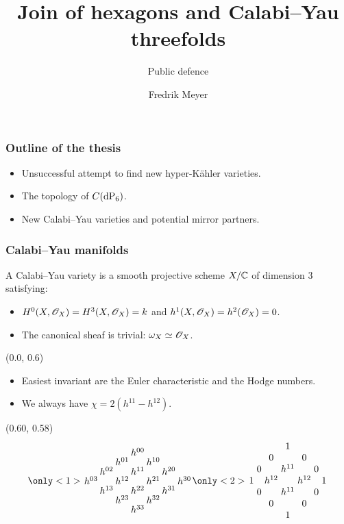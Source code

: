 \documentclass[UKenglish]{beamer}
\title{Join of hexagons and {Calabi--Yau} threefolds}
\subtitle{Public defence}
\author{Fredrik Meyer}
\begin{document}
\begin{frame}
\frametitle{Outline of the thesis}

\begin{itemize}
	\item Unsuccessful attempt to find new hyper-Kähler varieties.
	\item The topology of $C(\dP6)$.
	\item New Calabi--Yau varieties and potential mirror partners.
\end{itemize}

\end{frame}


\begin{frame}
\frametitle{Calabi--Yau manifolds}

\begin{definition}
A Calabi--Yau variety is a smooth projective scheme $X/\mathbb C$ of dimension $3$ satisfying:
\begin{itemize}
	\item $H^0(X,\mathscr{O}_X)=H^3(X,\mathscr{O}_X)=k$ and $h^1(X,\mathscr{O}_X)=h^2(\mathscr{O}_X)=0$.
	\item The canonical sheaf is trivial: $\omega_X \simeq \mathscr{O}_X$. 
\end{itemize}
\end{definition}

\begin{textblock}{0.5}(0.0, 0.6)
\begin{itemize}
	\item Easiest invariant are the Euler characteristic and the Hodge numbers.

	\item We always have $\chi = 2(h^{11}-h^{12})$. 
\end{itemize}
\end{textblock}

    \begin{textblock}{0.4}(0.60, 0.58)
    \[
    \only<1>{
   \arraycolsep=1pt\def\arraystretch{0.5}
\begin{array}[c]{ccccccc}
&&&               h^{00} \\  
 &         & h^{01} & & h^{10}  \\
&	h^{02} && h^{11}  && h^{20}  \\
   h^{03} && h^{12} && h^{21} && h^{30} \\
&	h^{13} && h^{22}  && h^{31}  \\
 &         & h^{23} & & h^{32}  \\
                &&& h^{33} 
\end{array}
}
\only<2>{
\arraycolsep=1.5pt\def\arraystretch{1}
\begin{array}[c]{ccccccc}
&&& 1 \\  
 &         & 0 & & 0  \\
&	0 && h^{11}  && 0  \\
1 && h^{12} && h^{12} && 1 \\
&	0 && h^{11}  && 0  \\
 &         & 0 & & 0  \\
 &&& 1 
\end{array}
}
\]


\end{textblock}
\end{frame}
\end{document}
